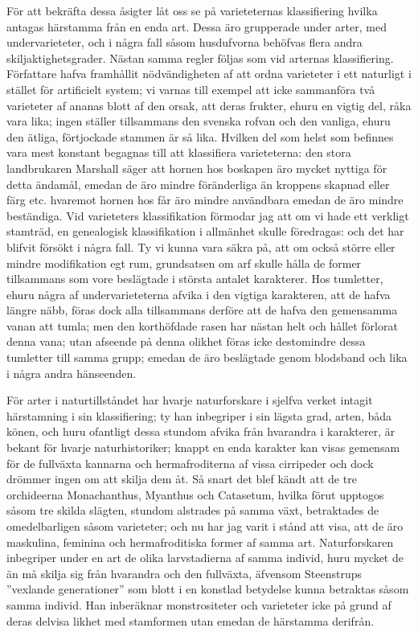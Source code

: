 För att bekräfta dessa åsigter låt oss se på varieteternas klassifiering hvilka antagas härstamma från en enda art. Dessa äro grupperade under arter, med undervarieteter, och i några fall såsom husdufvorna behöfvas flera andra skiljaktighetsgrader. Nästan samma regler följas som vid arternas klassifiering. Författare hafva framhållit nödvändigheten af att ordna varieteter i ett naturligt i stället för artificielt system; vi varnas till exempel att icke sammanföra två varieteter af ananas blott af den orsak, att deras frukter, ehuru en vigtig del, råka vara lika; ingen ställer tillsammans den svenska rofvan och den vanliga, ehuru den ätliga, förtjockade stammen är så lika. Hvilken del som helst som befinnes vara mest konstant begagnas till att klassifiera varieteterna: den stora landbrukaren Marshall säger att hornen hos boskapen äro mycket nyttiga för detta ändamål, emedan de äro mindre föränderliga än kroppens skapnad eller färg etc. hvaremot hornen hos får äro mindre användbara emedan de äro mindre beständiga. Vid varieteters klassifikation förmodar jag att om vi hade ett verkligt stamträd, en genealogisk klassifikation i allmänhet skulle föredragas: och det har blifvit försökt i några fall. Ty vi kunna vara säkra på, att om också större eller mindre modifikation egt rum, grundsatsen om arf skulle hålla de former tillsammans som vore beslägtade i största antalet karakterer. Hos tumletter, ehuru några af undervarieteterna afvika i den vigtiga karakteren, att de hafva längre näbb, föras dock alla tillsammans derföre att de hafva den gemensamma vanan att tumla; men den korthöfdade rasen har nästan helt och hållet förlorat denna vana; utan afseende på denna olikhet föras icke destomindre dessa tumletter till samma grupp; emedan de äro beslägtade genom blodsband och lika i några andra hänseenden.

För arter i naturtillståndet har hvarje naturforskare i sjelfva verket intagit härstamning i sin klassifiering; ty han inbegriper i sin lägsta grad, arten, båda könen, och huru ofantligt dessa stundom afvika från hvarandra i karakterer, är bekant för hvarje naturhistoriker; knappt en enda karakter kan visas gemensam för de fullväxta kannarna och hermafroditerna af vissa cirripeder och dock drömmer ingen om att skilja dem åt. Så snart det blef kändt att de tre orchideerna Monachanthus, Myanthus och Catasetum, hvilka förut upptogos såsom tre skilda slägten, stundom alstrades på samma växt, betraktades de omedelbarligen såsom varieteter; och nu har jag varit i stånd att visa, att de äro maskulina, feminina och hermafroditiska former af samma art. Naturforskaren inbegriper under en art de olika larvstadierna af samma individ, huru mycket de än må skilja sig från hvarandra och den fullväxta, äfvensom Steenstrups ”vexlande generationer” som blott i en konstlad betydelse kunna betraktas såsom samma individ. Han inberäknar monstrositeter och varieteter icke på grund af deras delvisa likhet med stamformen utan emedan de härstamma derifrån.

